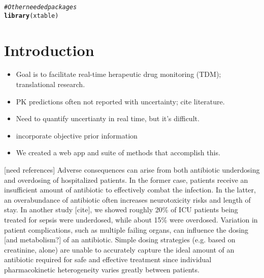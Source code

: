 \documentclass{article}\usepackage[]{graphicx}\usepackage[]{color}
\makeatletter
\newcommand{\hlcom}[1]{\textcolor[rgb]{0.678,0.584,0.686}{\textit{#1}}}%
\newcommand{\hlstd}[1]{\textcolor[rgb]{0.345,0.345,0.345}{#1}}%
\newcommand{\hlkwd}[1]{\textcolor[rgb]{0.737,0.353,0.396}{\textbf{#1}}}%
\newenvironment{kframe}{%
 \def\at@end@of@kframe{}%
 \ifinner\ifhmode%
  \def\at@end@of@kframe{\end{minipage}}%
  \begin{minipage}{\columnwidth}%
 \fi\fi%
 \def\FrameCommand##1{\hskip\@totalleftmargin \hskip-\fboxsep
 \colorbox{shadecolor}{##1}\hskip-\fboxsep
     \hskip-\linewidth \hskip-\@totalleftmargin \hskip\columnwidth}%
 \MakeFramed {\advance\hsize-\width
   \@totalleftmargin\z@ \linewidth\hsize
   \@setminipage}}%
 {\par\unskip\endMakeFramed%
 \at@end@of@kframe}
\newenvironment{knitrout}{}{} %
\makeatother
\begin{document}
\begin{knitrout}
\color{fgcolor}\begin{kframe}
\begin{alltt}
\hlcom{# Other needed packages}
\hlkwd{library}\hlstd{(xtable)}
\end{alltt}
\end{kframe}
\end{knitrout}



\section{Introduction}
\begin{itemize}
\item Goal is to facilitate real-time herapeutic drug monitoring (TDM); translational research.
\item PK predictions often not reported with uncertainty; cite literature.
\item Need to quantify uncertianty in real time, but it's difficult.
\item incorporate objective prior information
\item We created a web app and suite of methods that accomplish this.
\end{itemize}

[need references]
Adverse consequences can arise from both antibiotic underdosing and overdosing  of hospitalized patients. In the former case, patients receive an insufficient amount of antibiotic to effectively combat the infection. In the latter, an overabundance of antibiotic often increases neurotoxicity risks and length of stay. In another study [cite], we showed roughly 20\% of ICU patients being treated for sepsis were underdosed, while about 15\% were overdosed.  Variation in patient complications, such as multiple failing organs, can influence the dosing [and metabolism?] of an antibiotic. Simple dosing strategies (e.g. based on creatinine, alone) are unable to accurately capture the ideal amount of an antibiotic required for safe and effective treatment since individual pharmacokinetic heterogeneity varies greatly between patients.\\
\end{document}
